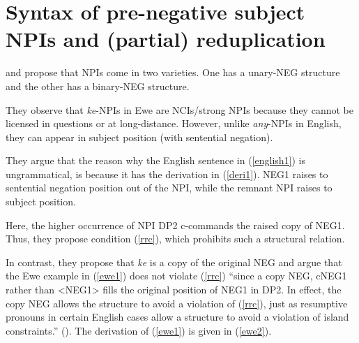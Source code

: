 \documentclass[output=paper,colorlinks,citecolor=brown]{langscibook}
\begin{document}
\section{Syntax of pre-negative subject NPIs and (partial) reduplication}

\cite{CollinsPostal2014} and \cite{CollinsEtAl2017} propose that NPIs come in two varieties. One has a unary-NEG structure and the other has a binary-NEG structure.

\ea
{}
\z
\z

They observe that \textit{ke}-NPIs in Ewe are NCIs/strong NPIs because they cannot be licensed in questions or at long-distance. However, unlike \textit{any}-NPIs in English, they can appear in subject position (with sentential negation).

\ea
{}
\z
\z

They argue that the reason why the English sentence in (\ref{english1}) is ungrammatical, is because it has the derivation in (\ref{deri1}). NEG1 raises to sentential negation position out of the NPI, while the remnant NPI raises to subject position.

\z

Here, the higher occurrence of  NPI DP2 c-commands the raised copy of NEG1. Thus, they propose condition (\ref{rrc}), which prohibits such a structural relation.

\z

In contrast, they propose that \textit{ke} is a copy of the original NEG and argue that the Ewe example in (\ref{ewe1}) does not violate (\ref{rrc}) ``since a copy NEG, cNEG1 rather than <NEG1> fills the original position of NEG1 in DP2. In effect, the copy NEG allows the structure to avoid a violation of (\ref{rrc}), just as resumptive pronouns in certain English cases allow a structure to avoid a violation of island constraints.'' (\citealt{CollinsEtAl2017}). The derivation of (\ref{ewe1}) is given in (\ref{ewe2}).
\end{document}

